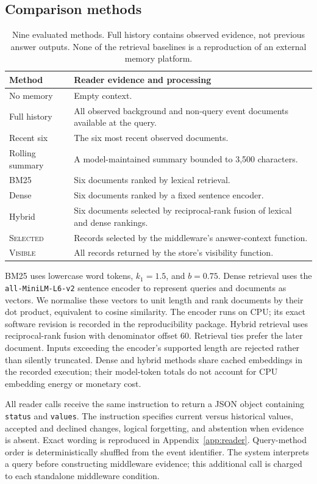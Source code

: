 \documentclass[11pt,a4paper]{article}
\newcommand{\sel}{\textsc{Selected}}
\newcommand{\vis}{\textsc{Visible}}
\begin{document}
\subsection{Comparison methods}
\begin{table}[ht]
\centering\small
\begin{tabularx}{\linewidth}{lX}
\toprule
Method & Reader evidence and processing \\
\midrule
No memory & Empty context. \\
Full history & All observed background and non-query event documents available at the query. \\
Recent six & The six most recent observed documents. \\
Rolling summary & A model-maintained summary bounded to 3,500 characters. \\
BM25 & Six documents ranked by lexical retrieval. \\
Dense & Six documents ranked by a fixed sentence encoder. \\
Hybrid & Six documents selected by reciprocal-rank fusion of lexical and dense rankings. \\
\sel{} & Records selected by the middleware's answer-context function. \\
\vis{} & All records returned by the store's visibility function. \\
\bottomrule
\end{tabularx}
\caption{Nine evaluated methods. Full history contains observed evidence, not previous answer outputs. None of the retrieval baselines is a reproduction of an external memory platform.}
\label{tab:methods}
\end{table}

BM25 uses lowercase word tokens, $k_1=1.5$, and $b=0.75$. Dense retrieval uses the \texttt{all-MiniLM-L6-v2} sentence encoder to represent queries and documents as vectors. We normalise these vectors to unit length and rank documents by their dot product, equivalent to cosine similarity. The encoder runs on CPU; its exact software revision is recorded in the reproducibility package. Hybrid retrieval uses reciprocal-rank fusion with denominator offset 60. Retrieval ties prefer the later document. Inputs exceeding the encoder's supported length are rejected rather than silently truncated. Dense and hybrid methods share cached embeddings in the recorded execution; their model-token totals do not account for CPU embedding energy or monetary cost.

All reader calls receive the same instruction to return a JSON object containing \texttt{status} and \texttt{values}. The instruction specifies current versus historical values, accepted and declined changes, logical forgetting, and abstention when evidence is absent. Exact wording is reproduced in Appendix~\ref{app:reader}. Query-method order is deterministically shuffled from the event identifier. The system interprets a query before constructing middleware evidence; this additional call is charged to each standalone middleware condition.
\end{document}
